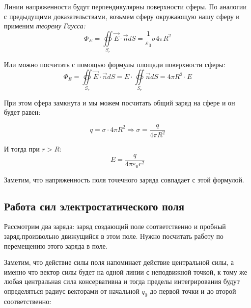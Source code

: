 \documentclass[../main.tex]{subfiles}
\begin{document}
Линии напряженности будут перпендикулярны поверхности сферы.
По аналогии с предыдущими доказательствами, возьмем сферу окружающую нашу сферу и применим \textit{теорему Гаусса:}
\[\Phi_E = \oiint\limits_{S_r} \vec{E} \cdot  \vec{n} dS = \frac{1}{\varepsilon_0}\sigma 4 \pi R^2\]

Или можно посчитать с помощью формулы площади поверхности сферы:
\[ \Phi_E = \oiint\limits_{S_r} \vec{E} \cdot \vec{n} dS = E \cdot \oiint\limits_{S_r} \vec{n} dS = 4 \pi R^2 \cdot E\]

При этом сфера замкнута и мы можем посчитать общий заряд на сфере и он будет равен:

\[ q = \sigma \cdot 4\pi R^2 \Rightarrow \sigma = \frac{q}{4\pi R^2}\]

И тогда при $r > R :$
\[ E = \frac{q}{4 \pi \varepsilon_0 r^2} \]

Заметим, что напряженность поля точечного заряда совпадает с этой формулой.

\subsection{Работа сил электростатического поля}

Рассмотрим два заряда: заряд создающий поле соответственно и пробный заряд,произвольно движущийся в этом поле. Нужно посчитать работу по перемещению этого заряда в поле.

\vspace{5px}

Заметим, что действие силы поля напоминает действие центральной силы, а именно что вектор силы будет на одной линии с неподвижной точкой, к тому же любая центральная сила консервативна и тогда пределы интегрирования будут определяться радиус векторами от начальной $q_0$ до первой точки и до второй соответственно:
\end{document}
